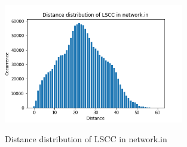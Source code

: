 \documentclass[12pt]{amsart}
\begin{document}
\begin{figure}[h]
\caption{Distance distribution of LSCC in network.in}
\centering
\includegraphics[width=0.7\textwidth]{distdist.png}
\label{distdist}
\end{figure}
\end{document}
